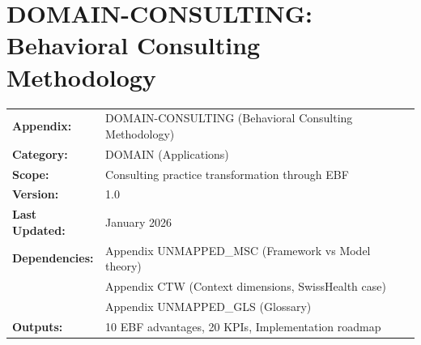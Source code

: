 %
%
%
%
%

\chapter{DOMAIN-CONSULTING: Behavioral Consulting Methodology}
\label{app:domain-consulting}


\begin{tcolorbox}[colback=blue!5!white, colframe=blue!75!black,
    title=\textbf{Appendix UNMAPPED_BHC: Application Domain}]

\begin{tabular}{@{}ll@{}}
\textbf{Appendix:} & DOMAIN-CONSULTING (Behavioral Consulting Methodology) \\
\textbf{Category:} & DOMAIN (Applications) \\
\textbf{Scope:} & Consulting practice transformation through EBF \\
\textbf{Version:} & 1.0 \\
\textbf{Last Updated:} & January 2026 \\
\textbf{Dependencies:} & Appendix UNMAPPED_MSC (Framework vs Model theory) \\
 & Appendix CTW (Context dimensions, SwissHealth case) \\
 & Appendix UNMAPPED_GLS (Glossary) \\
\textbf{Outputs:} & 10 EBF advantages, 20 KPIs, Implementation roadmap \\
\end{tabular}

\end{tcolorbox}

